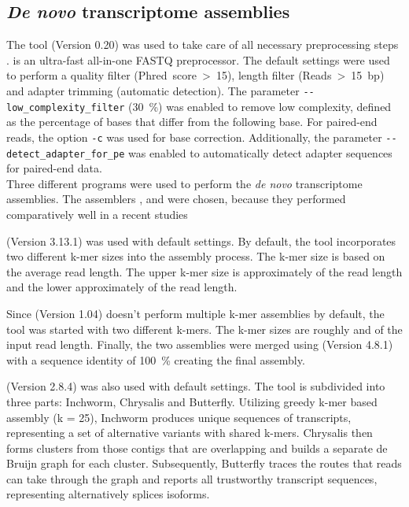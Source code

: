 \documentclass[12pt,a4paper,english]{article}
\begin{document}
\subsection{\textit{De novo} transcriptome assemblies}
	\label{ssec:assemblies}
	The tool \fastp (Version 0.20) was used to take care of all necessary preprocessing steps \citep{fastp:18}. \fastp is an ultra-fast all-in-one FASTQ preprocessor. The default settings were used to perform a quality filter (Phred~score~>~15), length filter (Reads~>~15~bp) and adapter trimming (automatic detection). The parameter \texttt{-{}-low\_complexity\_filter} (30~\%) was enabled to remove low complexity, defined as the percentage of bases that differ from the following base. For paired-end reads, the option \texttt{-c} was used for base correction. Additionally, the parameter \texttt{-{}-detect\_adapter\_for\_pe} was enabled to automatically detect adapter sequences for paired-end data.\\
	
	\noindent
	Three different programs were used to perform the \textit{de novo} transcriptome assemblies. The assemblers \spades \citep{rnaSPAdes:18}, \soap \citep{SOAPdenovo-Trans:14} and \trinity \citep{Trinity:11} were chosen, because they performed comparatively well in a recent studies \citep{hoelzer:19}
	
	\spades (Version 3.13.1) was used with default settings. By default, the tool incorporates two different k-mer sizes into the assembly process. 
	The k-mer size is based on the average read length. The upper k-mer size is approximately  of the read length and the lower approximately  of the read length.
	
	Since \soap (Version 1.04) doesn't perform multiple k-mer assemblies by default, the tool was started with two different k-mers. The k-mer sizes are roughly  and  of the input read length. Finally, the two assemblies were merged using \cdhit (Version 4.8.1) \citep{cd-hit:06,cd-hit:12} with a sequence identity of 100~\% creating the final \soap assembly.
	
	\trinity (Version 2.8.4) was also used with default settings. The tool is subdivided into three parts: Inchworm, Chrysalis and Butterfly. Utilizing greedy k-mer based assembly (k = 25), Inchworm produces unique sequences of transcripts, representing a set of alternative variants with shared k-mers.
	Chrysalis then forms clusters from those contigs that are overlapping and builds a separate de Bruijn graph for each cluster.
	Subsequently, Butterfly traces the routes that reads can take through the graph and reports all trustworthy transcript sequences, representing alternatively splices isoforms.\\
	
\end{document}
